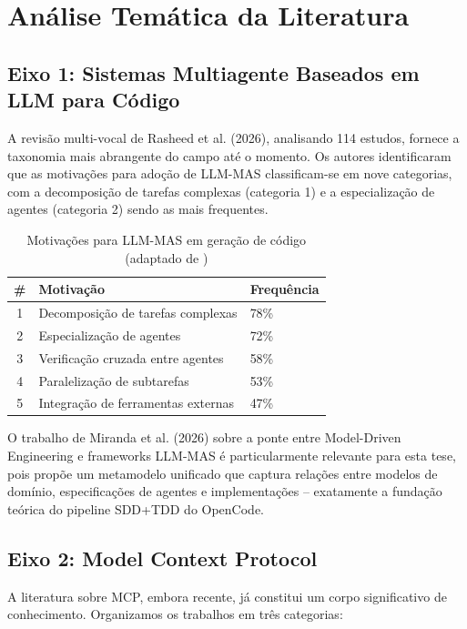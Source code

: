 \documentclass[12pt,a4paper,sumario=tradicional]{abntex2}
\begin{document}
\section{Análise Temática da Literatura}

\subsection{Eixo 1: Sistemas Multiagente Baseados em LLM para Código}

A revisão multi-vocal de Rasheed et al. (2026), analisando 114 estudos, fornece a taxonomia mais abrangente do campo até o momento. Os autores identificaram que as motivações para adoção de LLM-MAS classificam-se em nove categorias, com a decomposição de tarefas complexas (categoria 1) e a especialização de agentes (categoria 2) sendo as mais frequentes.

\begin{table}[H]
\centering
\caption{Motivações para LLM-MAS em geração de código (adaptado de \cite{rasheed2026llm})}
\label{tab:motivations}
\begin{tabular}{@{}cll@{}}
\toprule
\textbf{\#} & \textbf{Motivação} & \textbf{Frequência} \\
\midrule
1 & Decomposição de tarefas complexas & 78\% \\
2 & Especialização de agentes & 72\% \\
3 & Verificação cruzada entre agentes & 58\% \\
4 & Paralelização de subtarefas & 53\% \\
5 & Integração de ferramentas externas & 47\% \\
\bottomrule
\end{tabular}
\end{table}

O trabalho de Miranda et al. (2026) sobre a ponte entre Model-Driven Engineering e frameworks LLM-MAS é particularmente relevante para esta tese, pois propõe um metamodelo unificado que captura relações entre modelos de domínio, especificações de agentes e implementações -- exatamente a fundação teórica do pipeline SDD+TDD do OpenCode.

\subsection{Eixo 2: Model Context Protocol}

A literatura sobre MCP, embora recente, já constitui um corpo significativo de conhecimento. Organizamos os trabalhos em três categorias:
\end{document}
